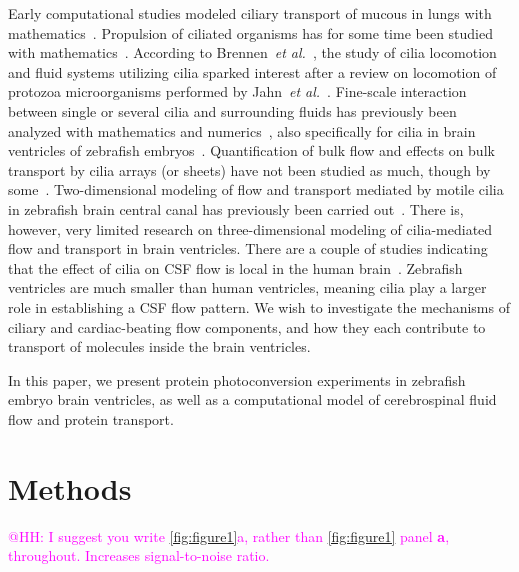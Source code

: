 \documentclass[fleqn]{wlscirep}
\newcommand{\mer}[1]{\textcolor{magenta}{#1}}
\begin{document}
Early computational studies modeled ciliary transport of mucous in lungs with mathematics~\cite{Fulford1986Muco-ciliaryLung}. Propulsion of ciliated organisms has for some time been studied with mathematics~\cite{BLAKE1974MechanicsMotion}. According to Brennen~\emph{et al.}~\cite{Brennen1977FluidFlagella}, the study of cilia locomotion and fluid systems utilizing cilia sparked interest after a review on locomotion of protozoa microorganisms performed by Jahn~\emph{et al.}~\cite{Jahn1972LocomotionProtozoa}. Fine-scale interaction between single or several cilia and surrounding fluids has previously been analyzed with mathematics and numerics~\cite{Guo2020SimulatingGeometries, Ruvalcaba2021NumericalTree, Smith2009MathematicalFluids, Cui2019NumericalMethod, Cui2022AFlow}, also specifically for cilia in brain ventricles of zebrafish embryos~\cite{Salman2022ComputationalEmbryo}. Quantification of bulk flow and effects on bulk transport by cilia arrays (or sheets) have not been studied as much, though by some~\cite{Ramirez-SanJuan2020Multi-scaleArrays}. Two-dimensional modeling of flow and transport mediated by motile cilia in zebrafish brain central canal has previously been carried out~\cite{Thouvenin2020OriginCanal}. There is, however, very limited research on three-dimensional modeling of cilia-mediated flow and transport in brain ventricles. There are a couple of studies indicating that the effect of cilia on CSF flow is local in the human brain~\cite{Siyahhan2014FlowVentricles, Yoshida2022EffectVentricles}. Zebrafish ventricles are much smaller than human ventricles, meaning cilia play a larger role in establishing a CSF flow pattern. We wish to investigate the mechanisms of ciliary and cardiac-beating flow components, and how they each contribute to transport of molecules inside the brain ventricles.

In this paper, we present protein photoconversion experiments in zebrafish embryo brain ventricles, as well as a computational model of cerebrospinal fluid flow and protein transport.

\section*{Methods}
\label{sec:methods}

\mer{@HH: I suggest you write \cref{fig:figure1}a, rather than \cref{fig:figure1} panel \textbf{a}, throughout. Increases signal-to-noise ratio.}
\end{document}
